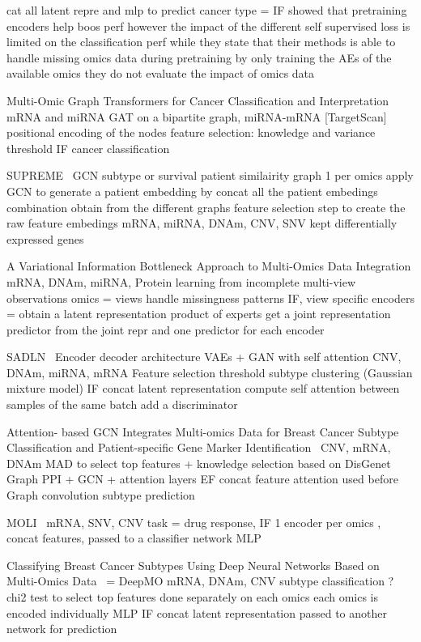 \documentclass[../main.tex]{subfiles}
\begin{document}
		cat all latent repre and mlp to predict cancer type = IF
		showed that pretraining encoders help boos perf however the impact of the different self supervised loss is limited on the classification perf
		while they state that their methods is able to handle missing omics data during pretraining by only training the AEs of the available omics they do not evaluate the impact of omics data


		Multi-Omic Graph Transformers for Cancer Classification and Interpretation~\cite{Kaczmarek2021}
		mRNA and miRNA
		GAT on a bipartite graph, miRNA-mRNA [TargetScan]
		positional encoding of the nodes
		feature selection: knowledge and variance threshold
		IF  cancer classification

		SUPREME~\cite{Kesimoglu2022} GCN subtype or survival patient similairity graph 1 per omics
		apply GCN to generate a patient embedding by concat all the patient embedings combination obtain from the different graphs
		feature selection step to create the raw feature embedings
		mRNA, miRNA, DNAm, CNV, SNV
		kept differentially expressed genes

		A Variational Information Bottleneck Approach to Multi-Omics Data Integration
		\cite{Lee2021AVI}
		mRNA, DNAm, miRNA, Protein
		learning from incomplete multi-view observations
		omics = views handle missingness patterns
		IF, view specific encoders = obtain a latent representation
		product of experts get a joint representation
		predictor from the joint repr and one predictor for each encoder

		SADLN~\cite{SADLN} Encoder decoder architecture VAEs + GAN with self attention
		CNV, DNAm, miRNA, mRNA
		Feature selection threshold
		subtype clustering (Gaussian mixture model)
		IF concat latent representation
		compute self attention between samples of the same batch
		add a discriminator

		Attention- based GCN Integrates Multi-omics Data for Breast Cancer Subtype Classification and Patient-specific Gene Marker Identification~\cite{Guo2023}
		CNV, mRNA, DNAm
		MAD to select top features + knowledge selection based on DisGenet
		Graph PPI + GCN + attention layers
		EF concat feature
		attention used before Graph convolution
		subtype prediction

		MOLI~\cite{MOLI}
		mRNA, SNV, CNV
		task = drug response, IF
		1 encoder per omics , concat features, passed to a classifier network
		MLP

		Classifying Breast Cancer Subtypes Using Deep Neural Networks Based on Multi-Omics Data~\cite{Lin2020} = DeepMO
		mRNA, DNAm, CNV
		subtype classification ?
		chi2 test to select top features done separately on each omics
		each omics is encoded individually MLP
		IF concat latent representation
		passed to another network for prediction
\end{document}
